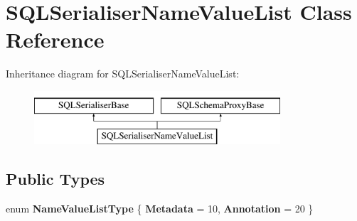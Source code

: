 \hypertarget{class_s_q_l_serialiser_name_value_list}{}\section{S\+Q\+L\+Serialiser\+Name\+Value\+List Class Reference}
\label{class_s_q_l_serialiser_name_value_list}
Inheritance diagram for S\+Q\+L\+Serialiser\+Name\+Value\+List\+:\begin{figure}[H]
\begin{center}
\leavevmode
\includegraphics[height=2.000000cm]{class_s_q_l_serialiser_name_value_list}
\end{center}
\end{figure}
\subsection*{Public Types}
\begin{DoxyCompactItemize}
\item 
\mbox{\label{class_s_q_l_serialiser_name_value_list_a5e130df5ddd5714cf86b47b06387c2d5}} 
enum {\bfseries Name\+Value\+List\+Type} \{ {\bfseries Metadata} = 10, 
{\bfseries Annotation} = 20
 \}
\end{DoxyCompactItemize}
